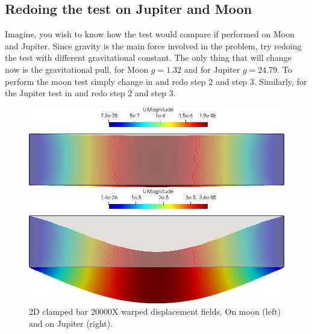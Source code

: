 \subsection{Redoing the test on Jupiter and Moon}

Imagine, you wish to know how the test would compare if performed on
Moon and Jupiter. Since gravity is the main force involved in the
problem, try redoing the test with different gravitational constant. The
only thing that will change now is the gravitational pull, for Moon
\(g=1.32\) and for Jupiter \(g=24.79\). To perform the moon test simply
change  in  and redo
step 2 and step 3. Similarly, for the Jupiter test
 in  and redo step 2
and step 3.

\begin{figure}[htbp]
    \centering
    \begin{minipage}[t][2.5cm][t]{0.4\textwidth}
    \includegraphics[align=t,width=1\textwidth]{./Images/le-2d-bar-moon.png}
    \end{minipage}\hspace{.1\textwidth}
    \begin{minipage}[t][2.5cm][t]{0.4\textwidth}
    \includegraphics[align=t,width=1\textwidth]{./Images/le-2d-bar-Jupiter.png}
    \end{minipage}
    \caption{2D clamped bar 20000X warped displacement fields. On moon (left) and  on Jupiter (right).}
    \label{fig:moon-jupiter}
\end{figure}
